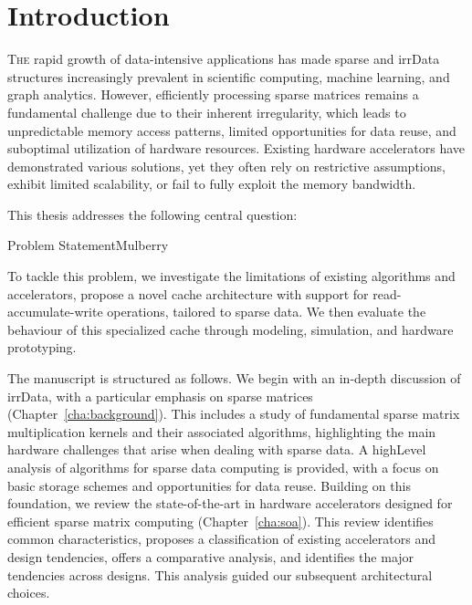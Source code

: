 
\FancyHeadRight{\sectitle}

\renewcommand{\sectitle}{Introduction}

\chapter*{\sectitle}
\addstarredchapter{\sectitle}

\lettrine{T}{he} rapid growth of data-intensive applications has made sparse and \gls{irrData} structures increasingly prevalent in scientific computing, machine learning, and graph analytics.
However, efficiently processing sparse matrices remains a fundamental challenge due to their inherent irregularity, which leads to unpredictable memory access patterns, limited opportunities for data reuse, and suboptimal utilization of hardware resources.
Existing hardware accelerators have demonstrated various solutions, yet they often rely on restrictive assumptions, exhibit limited scalability, or fail to fully exploit the memory bandwidth.

This thesis addresses the following central question:

\bigskip
\begin{highlight}{Problem Statement}{Mulberry}
\end{highlight}
\bigskip

To tackle this problem, we investigate the limitations of existing algorithms and accelerators, propose a novel cache architecture with support for read-accumulate-write operations, tailored to sparse data.
We then evaluate the behaviour of this specialized cache through modeling, simulation, and hardware prototyping.

\bigskip\bigskip

The manuscript is structured as follows.
We begin with an in-depth discussion of \gls{irrData}, with a particular emphasis on sparse matrices (Chapter~\ref{cha:background}).
This includes a study of fundamental sparse matrix multiplication kernels and their associated algorithms, highlighting the main hardware challenges that arise when dealing with sparse data.
A \gls{highLevel} analysis of algorithms for sparse data computing is provided, with a focus on basic storage schemes and opportunities for data reuse.
Building on this foundation, we review the state-of-the-art in hardware accelerators designed for efficient sparse matrix computing (Chapter~\ref{cha:soa}).
This review identifies common characteristics, proposes a classification of existing accelerators and design tendencies, offers a comparative analysis, and identifies the major tendencies across designs.
This analysis guided our subsequent architectural choices.


